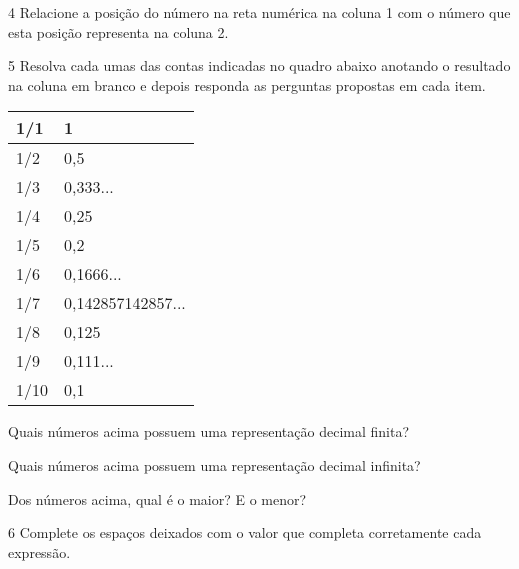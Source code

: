 
\num{4} Relacione a posição do número na reta numérica na coluna 1 com o
número que esta posição representa na coluna 2.



\num{5} Resolva cada umas das contas indicadas no quadro abaixo anotando o
resultado na coluna em branco e depois responda as perguntas propostas
em cada item.

\begin{longtable}[]{@{}ll@{}}
\toprule
1/1 & 1\tabularnewline
\midrule
\endhead
1/2 & 0,5\tabularnewline
1/3 & 0,333...\tabularnewline
1/4 & 0,25\tabularnewline
1/5 & 0,2\tabularnewline
1/6 & 0,1666...\tabularnewline
1/7 & 0,142857142857...\tabularnewline
1/8 & 0,125\tabularnewline
1/9 & 0,111...\tabularnewline
1/10 & 0,1\tabularnewline
\bottomrule
\end{longtable}

\begin{escolha}
\item
  Quais números acima possuem uma representação decimal finita?


\item
  Quais números acima possuem uma representação decimal infinita?


\item
  Dos números acima, qual é o maior? E o menor?

\end{escolha}


\num{6} Complete os espaços deixados com o valor que completa corretamente
cada expressão.

